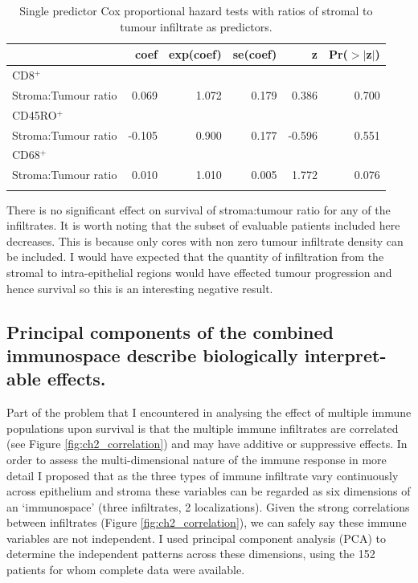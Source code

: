 \begin{table}[ht]
\centering
\begin{tabular}{rrrrrr}
  \hline
 & coef & exp(coef) & se(coef) & z & Pr($>$$|$z$|$) \\ 
  \hline
\multicolumn{5}{l}{

CD8$^+$
}\\
Stroma:Tumour ratio & 0.069 & 1.072 & 0.179 & 0.386 & 0.700 \\ 
 
\multicolumn{5}{l}{CD45RO$^+$
}\\
Stroma:Tumour ratio & -0.105 & 0.900 & 0.177 & -0.596 & 0.551 \\ 

\multicolumn{5}{l}{

CD68$^+$
}\\
Stroma:Tumour ratio & 0.010 & 1.010 & 0.005 & 1.772 & 0.076 \\ 
   \hline
\multicolumn{5}{l}{}\\
\end{tabular}
\caption[Cox regression for ratio of Tumour to Stroma infiltrate]{Single predictor Cox proportional hazard tests with ratios of stromal to tumour infiltrate as predictors.} 
\label{tab:s:t}
\end{table}
There is no significant effect on survival of stroma:tumour ratio for any of the infiltrates. It is worth noting that the subset of evaluable patients included here decreases. This is because only cores with non zero tumour infiltrate density can be included. I would have expected that the quantity of infiltration from the stromal to intra-epithelial regions would have effected tumour progression and hence survival so this is an interesting negative result.

\subsection{Principal components of the combined immunospace describe biologically interpret-able effects.}
 Part of the problem that I encountered in analysing the effect of multiple immune populations upon survival is that the multiple immune infiltrates are correlated (see Figure \ref{fig:ch2_correlation}) and may have additive or suppressive effects.  In order to assess the multi-dimensional nature of the immune response in more detail I proposed that as the three types of immune infiltrate vary continuously across epithelium and stroma these variables can be regarded as six dimensions of an ‘immunospace’ (three infiltrates, 2 localizations).  Given the strong correlations between infiltrates (Figure \ref{fig:ch2_correlation}), we can safely say these immune variables are not independent. I used principal component analysis (PCA) to determine the independent patterns across these dimensions, using the 152 patients for whom complete data were available.
 
